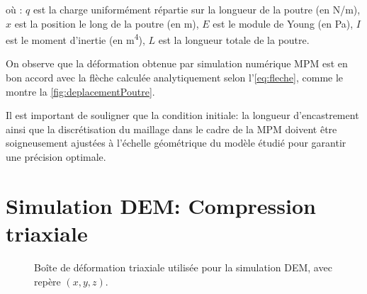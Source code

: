 \documentclass[a4paper,12pt]{report}
\begin{document}
où :
$q$ est la charge uniformément répartie sur la longueur de la poutre (en N/m),
$x$ est la position le long de la poutre (en m),
$E$ est le module de Young (en Pa),
$I$ est le moment d'inertie (en m\textsuperscript{4}),
$L$ est la longueur totale de la poutre.

On observe que la déformation obtenue par simulation numérique MPM est en bon accord avec la flèche calculée analytiquement selon l'\autoref{eq:fleche}, comme le montre la \autoref{fig:deplacementPoutre}.

Il est important de souligner que la condition initiale: la longueur d'encastrement ainsi que la discrétisation du maillage dans le cadre de la MPM doivent être soigneusement ajustées à l’échelle géométrique du modèle étudié pour garantir une précision optimale.




\section{Simulation DEM: Compression triaxiale}

\begin{figure}[h]
    \centering
    \caption{Boîte de déformation triaxiale utilisée pour la simulation DEM, avec repère $(x, y, z)$.}
    \label{fig:boiteDeformation}
\end{figure}
\end{document}
